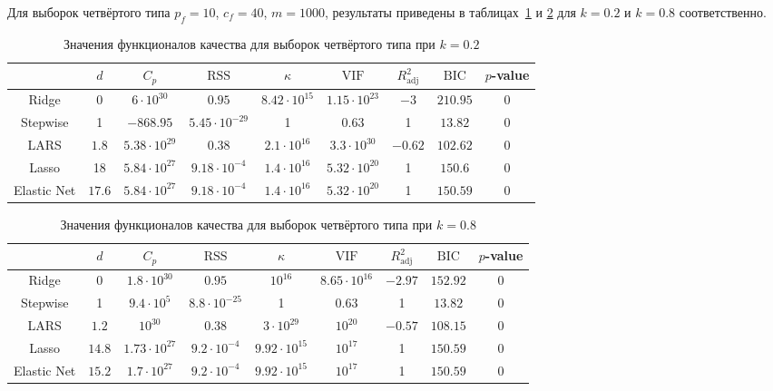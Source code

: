 \documentclass[a4paper,12pt]{article}
\newcommand{\vif}{\mathrm{VIF}}
\newcommand{\rss}{\mathrm{RSS}}
\newcommand{\bic}{\mathrm{BIC}}
\newcommand{\radj}{R_{\text{adj}}^2}
\begin{document}
Для выборок четвёртого типа $p_f = 10$, $ c_f = 40$, $m = 1000$, результаты приведены в таблицах~\ref{tab:sumort_0.2} и \ref{tab:sumort_0.8} для $k = 0.2$ и $k = 0.8$ соответственно.
\begin{table}[!h]
\centering
\caption{Значения функционалов качества для выборок четвёртого типа при $k = 0.2$}
\begin{tabular}{|c|c|c|c|c|c|c|c|c|}
\hline 
 & $d$ & $C_p$ & $\rss$ & $\kappa$ & $\vif$ & $\radj$ & $\bic$ & $p$-value \\ 
\hline 
Ridge & 0 & $6 \cdot 10^{30}$ & $0.95$ & $8.42 \cdot 10^{15}$ & $ 1.15 \cdot 10^{23} $ & $-3$ & $210.95$ & 0 \\ 
\hline 
Stepwise & 1 & $-868.95$ & $ 5.45 \cdot 10^{-29} $ & 1 & $0.63$ & 1 & $13.82$ & 0 \\
\hline
LARS & $1.8$ & $ 5.38 \cdot 10^{29} $ & $ 0.38$ & $ 2.1 \cdot 10^{16}$ & $3.3 \cdot 10^{30}$ & $-0.62$ & $102.62$  & 0 \\ 
\hline 
Lasso & 18 & $5.84 \cdot 10^{27}$ & $ 9.18 \cdot 10^{-4}$ & $1.4 \cdot 10^{16}$ & $ 5.32 \cdot 10^{20}$ & 1  & $150.6$ & 0 \\ 
\hline 
Elastic Net & $17.6$ & $5.84 \cdot 10^{27}$ & $ 9.18 \cdot 10^{-4}$ & $1.4 \cdot 10^{16}$ & $ 5.32 \cdot 10^{20} $ & 1 & $150.59$ & 0 \\
\hline
\end{tabular}
\label{tab:sumort_0.2}
\end{table} 

\begin{table}[!h]
\centering
\caption{Значения функционалов качества для выборок четвёртого типа при $k = 0.8$}
\begin{tabular}{|c|c|c|c|c|c|c|c|c|}
\hline 
 & $d$ & $C_p$ & $\rss$ & $\kappa$ & $\vif$ & $\radj$ & $\bic$ & $p$-value \\ 
\hline 
Ridge & 0 & $1.8 \cdot 10^{30}$ & $0.95$ & $10^{16}$ & $8.65 \cdot 10^{16}$ & $-2.97$ & $152.92$ & 0 \\ 
\hline
Stepwise & 1 & $9.4 \cdot 10^5$ & $8.8 \cdot 10^{-25}$ & 1 & $0.63$ & 1 & $13.82$ & 0 \\
\hline  
LARS & $1.2$ & $10^{30}$ & $0.38$ & $3 \cdot 10^{29}$ & $10^{20}$ & $-0.57$ & $108.15$ & 0 \\ 
\hline
Lasso & $ 14.8 $ & $ 1.73 \cdot 10^{27}$ & $ 9.2 \cdot 10^{-4}$ & $ 9.92 \cdot 10^{15}$ & $ 10^{17}$ & 1 & $150.59$ & 0 \\ 
\hline 
Elastic Net & $15.2$ & $1.7 \cdot 10^{27}$ & $9.2 \cdot 10^{-4}$ & $9.92 \cdot 10^{15}$ & $10^{17}$ & 1 & $150.59$ & 0 \\
\hline
\end{tabular}
\label{tab:sumort_0.8}
\end{table} 
\end{document}
